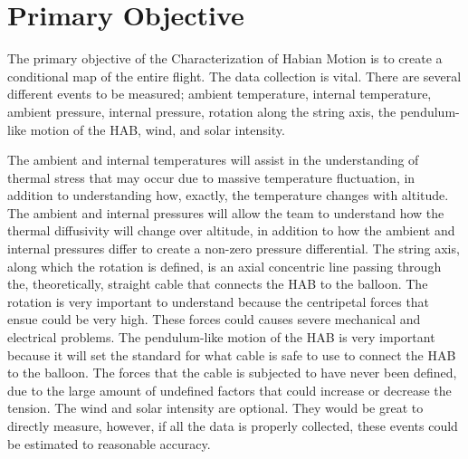 \documentclass[conference]{IEEEtran} %
\begin{document}
\section{Primary Objective}\label{sec:primary-obj}

The primary objective of the Characterization of Habian Motion is to create a conditional map of the entire flight. The data collection is vital. There
are several different events to be measured; ambient temperature, internal temperature, ambient pressure, internal pressure, rotation along the string axis,
the pendulum-like motion of the HAB, wind, and solar intensity.

The ambient and internal temperatures will assist in the understanding of thermal stress that may occur due to massive temperature fluctuation, in addition to
understanding how, exactly, the temperature changes with altitude. The ambient and internal pressures will allow the team to understand how the thermal diffusivity will change
over altitude, in addition to how the ambient and internal pressures differ to create a non-zero pressure differential. The string axis, along which the rotation is defined,
is an axial concentric line passing through the, theoretically, straight cable that connects the HAB to the balloon. The rotation is very important to understand because the
centripetal forces that ensue could be very high. These forces could causes severe mechanical and electrical problems. The pendulum-like motion of the HAB is very important because
it will set the standard for what cable is safe to use to connect the HAB to the balloon. The forces that the cable is subjected to have never been defined, due to the large amount of undefined
factors that could increase or decrease the tension. The wind and solar intensity are optional. They would be great to directly measure, however, if all the data is properly collected,
these events could be estimated to reasonable accuracy.
\end{document}
